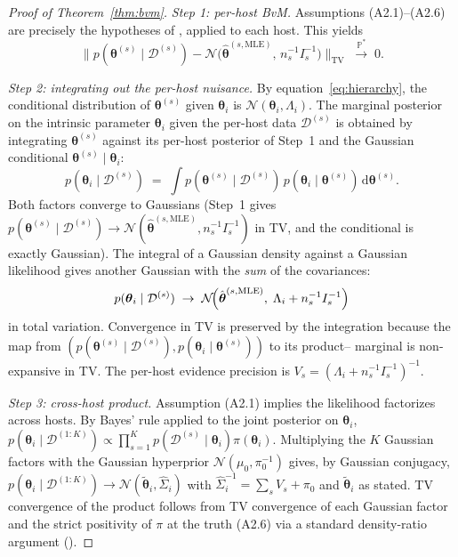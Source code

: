 \documentclass[12pt]{article}
\theoremstyle{plain}
\theoremstyle{definition}
\theoremstyle{remark}
\renewcommand{\d}{\mathrm{d}}
\newcommand{\norm}[1]{\lVert #1 \rVert}
\begin{document}
\begin{proof}[Proof of Theorem~\ref{thm:bvm}]
\emph{Step 1: per-host BvM.}  Assumptions (A2.1)--(A2.6) are precisely
the hypotheses of \citet[Theorem~10.1]{vdVaart1998}, applied to each
host.  This yields
\begin{equation}\label{eq:bvm_perhost}
  \norm{p(\boldsymbol\theta^{(s)}\mid\mathcal{D}^{(s)})
        - \mathcal{N}\!\bigl(\hat{\boldsymbol\theta}^{(s,\mathrm{MLE})},\,
        n_s^{-1}I_s^{-1}\bigr)}_{\mathrm{TV}}
   \;\xrightarrow{\mathbb{P}^*}\; 0.
\end{equation}

\emph{Step 2: integrating out the per-host nuisance.}  By
equation~\eqref{eq:hierarchy}, the conditional distribution of
$\boldsymbol\theta^{(s)}$ given $\boldsymbol\theta_i$ is
$\mathcal{N}(\boldsymbol\theta_i,\Lambda_i)$.  The marginal posterior on
the intrinsic parameter $\boldsymbol\theta_i$ given the per-host data
$\mathcal{D}^{(s)}$ is obtained by integrating $\boldsymbol\theta^{(s)}$
against its per-host posterior of Step~1 and the Gaussian conditional
$\boldsymbol\theta^{(s)}\mid\boldsymbol\theta_i$:
\[
  p(\boldsymbol\theta_i\mid\mathcal{D}^{(s)})
   \;=\;\int p(\boldsymbol\theta^{(s)}\mid\mathcal{D}^{(s)})\,
              p(\boldsymbol\theta_i\mid\boldsymbol\theta^{(s)})\,
        \d\boldsymbol\theta^{(s)} .
\]
Both factors converge to Gaussians (Step~1 gives
$p(\boldsymbol\theta^{(s)}\mid\mathcal{D}^{(s)})\to
\mathcal{N}(\hat{\boldsymbol\theta}^{(s,\mathrm{MLE})},n_s^{-1}I_s^{-1})$ in
TV, and the conditional is exactly Gaussian).  The integral of a Gaussian
density against a Gaussian likelihood gives another Gaussian with the
\emph{sum} of the covariances:
\[
   p(\boldsymbol\theta_i\mid\mathcal{D}^{(s)})
   \;\to\;\mathcal{N}\!\Bigl(\hat{\boldsymbol\theta}^{(s,\mathrm{MLE})},\;
       \Lambda_i+n_s^{-1}I_s^{-1}\Bigr)
\]
in total variation.  Convergence in TV is preserved by the integration
because the map from
$(p(\boldsymbol\theta^{(s)}\mid\mathcal{D}^{(s)}),
p(\boldsymbol\theta_i\mid\boldsymbol\theta^{(s)}))$ to its product--
marginal is non-expansive in TV.  The per-host evidence precision is
$V_s=(\Lambda_i+n_s^{-1}I_s^{-1})^{-1}$.

\emph{Step 3: cross-host product.}  Assumption (A2.1) implies the
likelihood factorizes across hosts.  By Bayes' rule applied to the
joint posterior on $\boldsymbol\theta_i$,
$p(\boldsymbol\theta_i\mid\mathcal{D}^{(1:K)})\propto\prod_{s=1}^K
p(\mathcal{D}^{(s)}\mid\boldsymbol\theta_i)\pi(\boldsymbol\theta_i)$.
Multiplying the $K$ Gaussian factors with the Gaussian hyperprior
$\mathcal{N}(\mu_0,\pi_0^{-1})$ gives, by Gaussian conjugacy,
\(p(\boldsymbol\theta_i\mid\mathcal{D}^{(1:K)})\to
\mathcal{N}(\tilde{\boldsymbol\theta}_i,\hat\Sigma_i)\)
with $\hat\Sigma_i^{-1}=\sum_s V_s+\pi_0$ and $\tilde{\boldsymbol\theta}_i$
as stated.  TV convergence of the product follows from TV convergence
of each Gaussian factor and the strict positivity of $\pi$ at the truth
(A2.6) via a standard density-ratio argument
(\citet[\S 8.3]{Ghosal2017}).


\end{proof}
\end{document}
